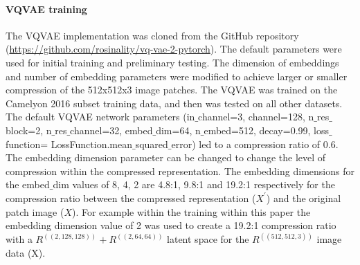 \documentclass[review]{elsarticle}
\begin{document}
\paragraph{VQVAE training} The VQVAE implementation was cloned from the GitHub repository (\url{https://github.com/rosinality/vq-vae-2-pytorch}). The default parameters were used for initial training and preliminary testing. The dimension of embeddings and number of embedding parameters were modified to achieve larger or smaller compression of the 512x512x3 image patches. The VQVAE was trained on the Camelyon 2016 subset training data, and then was tested on all other datasets.\\
The default VQVAE network parameters (in$\_$channel=3, channel=128, n$\_$res$\_$block=2, n$\_$res$\_$channel=32, embed$\_$dim=64, n$\_$embed=512, decay=0.99, loss$\_$function= LossFunction.mean$\_$squared$\_$error) led to a compression ratio of 0.6. The embedding dimension parameter can be changed to change the level of compression within the compressed representation. The embedding dimensions for the embed$\_$dim values of 8, 4, 2 are 4.8:1, 9.8:1 and 19.2:1 respectively for the compression ratio between the compressed representation ($X^{'}$) and the original patch image ($X$). For example within the training within this paper the embedding dimension value of 2 was used to create a 19.2:1 compression ratio with a $R^{((2,128,128))}+R^{((2,64,64))}$ latent space for the $R^{((512,512,3))}$ image data (X).



\end{document}

